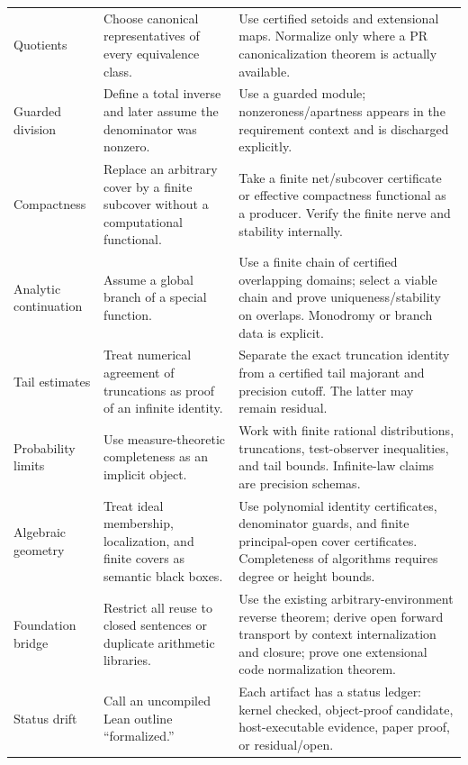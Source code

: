 \begin{longtable}{p{}p{}p{}}
Quotients &
Choose canonical representatives of every equivalence class. &
Use certified setoids and extensional maps.  Normalize only where a PR
canonicalization theorem is actually available.\\

Guarded division &
Define a total inverse and later assume the denominator was nonzero. &
Use a guarded module; nonzeroness/apartness appears in the requirement context
and is discharged explicitly.\\

Compactness &
Replace an arbitrary cover by a finite subcover without a computational
functional. &
Take a finite net/subcover certificate or effective compactness functional as
a producer.  Verify the finite nerve and stability internally.\\

Analytic continuation &
Assume a global branch of a special function. &
Use a finite chain of certified overlapping domains; select a viable chain and
prove uniqueness/stability on overlaps.  Monodromy or branch data is explicit.\\

Tail estimates &
Treat numerical agreement of truncations as proof of an infinite identity. &
Separate the exact truncation identity from a certified tail majorant and
precision cutoff.  The latter may remain residual.\\

Probability limits &
Use measure-theoretic completeness as an implicit object. &
Work with finite rational distributions, truncations, test-observer
inequalities, and tail bounds.  Infinite-law claims are precision schemas.\\

Algebraic geometry &
Treat ideal membership, localization, and finite covers as semantic black
boxes. &
Use polynomial identity certificates, denominator guards, and finite
principal-open cover certificates.  Completeness of algorithms requires degree
or height bounds.\\

Foundation bridge &
Restrict all reuse to closed sentences or duplicate arithmetic libraries. &
Use the existing arbitrary-environment reverse theorem; derive open forward
transport by context internalization and closure; prove one extensional code
normalization theorem.\\

Status drift &
Call an uncompiled Lean outline ``formalized.'' &
Each artifact has a status ledger: kernel checked, object-proof candidate,
host-executable evidence, paper proof, or residual/open.\\
\bottomrule
\end{longtable}

